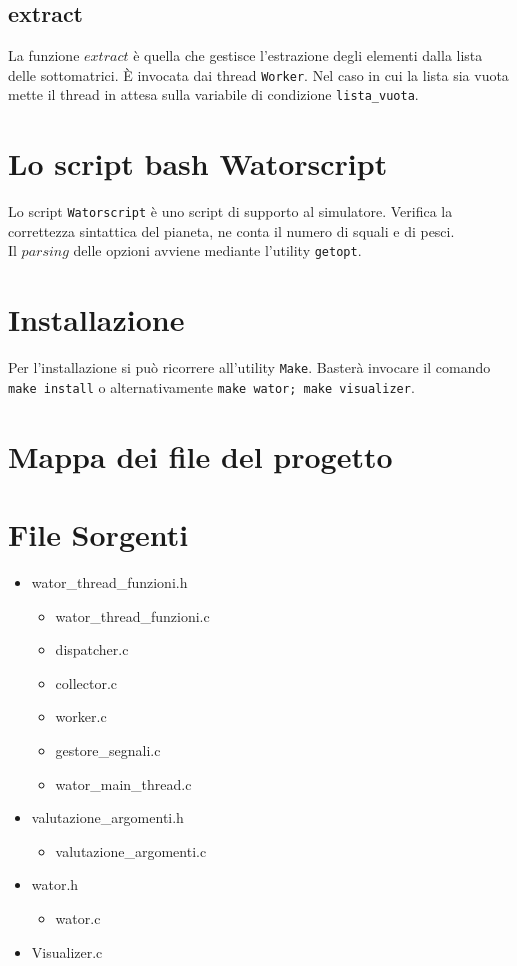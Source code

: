 \documentclass[]{article}
\begin{document}
\subsection{extract}
La funzione $extract$ è quella che gestisce l'estrazione degli elementi dalla lista delle sottomatrici. È invocata dai thread \texttt{Worker}. Nel caso in cui la lista sia vuota mette il thread in attesa sulla variabile di condizione \texttt{lista\_vuota}.
\section{Lo script bash Watorscript}
Lo script \texttt{Watorscript} è uno script di supporto al simulatore. Verifica la correttezza sintattica del pianeta, ne conta il numero di squali e di pesci. \\
Il $parsing$ delle opzioni avviene mediante l'utility \texttt{getopt}. 

\section{Installazione}
Per l'installazione si può ricorrere all'utility \texttt{Make}. Basterà invocare il comando \texttt{make install} o alternativamente \texttt{make wator; make visualizer}.
\section{Mappa dei file del progetto}
\section{File Sorgenti}
\begin{itemize}
	\item wator\_thread\_funzioni.h
	\begin{itemize}
		\item wator\_thread\_funzioni.c
		\item dispatcher.c
		\item collector.c
		\item worker.c
		\item gestore\_segnali.c
		\item wator\_main\_thread.c
	\end{itemize} 
	\item valutazione\_argomenti.h
	\begin{itemize}
		\item valutazione\_argomenti.c
	\end{itemize}
	\item wator.h
	\begin{itemize}
		\item wator.c
	\end{itemize}
	\item Visualizer.c
\end{itemize}
\end{document}
